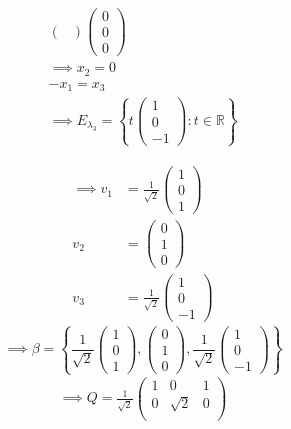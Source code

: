 \begin{enumerate}
\begin{itemize}
\begin{gather}
\begin{pmatrix}
\end{pmatrix}
\begin{pmatrix}
0\\0\\0
\end{pmatrix}\\
\implies x_2 = 0\\
-x_1 = x_3\\
\implies E_{\lambda_3} = \left\{
t\begin{pmatrix}
1\\0\\-1
\end{pmatrix}\colon t \in \mathbb{R}
\right\}
\end{gather}
\end{itemize}
\begin{align}
\implies v_1 &= \frac{1}{\sqrt{2}}\begin{pmatrix}1\\0\\1\end{pmatrix}\\
v_2 &= \begin{pmatrix}0\\1\\0\end{pmatrix}\\
v_3 &= \frac{1}{\sqrt{2}} \begin{pmatrix}1\\0\\-1\end{pmatrix}
\end{align}
\begin{equation}
\implies \beta = \left\{
\frac{1}{\sqrt{2}}\begin{pmatrix}1\\0\\1\end{pmatrix},
\begin{pmatrix}0\\1\\0\end{pmatrix},
\frac{1}{\sqrt{2}} \begin{pmatrix}1\\0\\-1\end{pmatrix}
\right\}
\end{equation}
\begin{gather}
\implies Q = \frac{1}{\sqrt{2}}\begin{pmatrix}
1 & 0 & 1\\
0 & \sqrt{2} & 0\\

\end{pmatrix}
\end{gather}
\end{enumerate}
